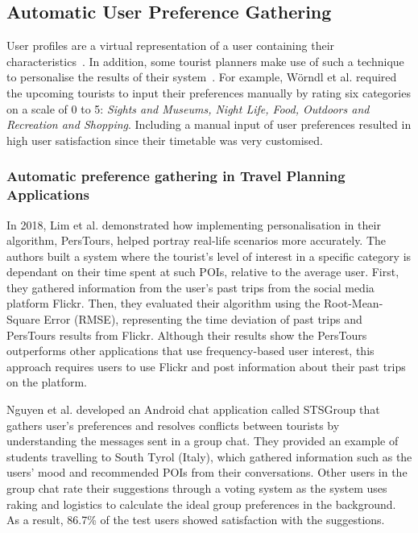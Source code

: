 
\subsection{Automatic User Preference Gathering}

User profiles are a virtual representation of a user
containing their characteristics~\cite{Cufoglu}. In
addition, some tourist planners make use of such a
technique to personalise the results of their
system~\cite{Worndl2017, Lim2018a, Tumas2009,
Gavalas2015}. For example, Wörndl et al.
\cite{Worndl2017} required the upcoming tourists to
input their preferences manually by rating six
categories on a scale of 0 to 5: \textit{Sights and Museums,
Night Life, Food, Outdoors and Recreation
 and Shopping}. Including a manual input of user
preferences resulted in high user satisfaction since
their timetable was very customised.

\subsubsection{Automatic preference gathering in Travel Planning Applications}

In 2018, Lim et al.\cite{Lim2018a} demonstrated how
implementing personalisation in their algorithm,
PersTours, helped portray real-life scenarios more
accurately. The authors built a system where the
tourist’s level of interest in a specific category is
dependant on their time spent at such POIs, relative
to the average user. First, they gathered information
from the user’s past trips from the social media
platform Flickr. Then, they evaluated their algorithm
using the Root-Mean-Square Error (RMSE), representing
the time deviation of past trips and PersTours results
from Flickr. Although their results show the PersTours
outperforms other applications that use
frequency-based user interest, this approach requires
users to use Flickr and post information about their
past trips on the platform.
 
Nguyen et al.\cite{Nguyen2018} developed an Android
chat application called STSGroup that gathers user’s
preferences and resolves conflicts between tourists by
understanding the messages sent in a group chat. They
provided an example of students travelling to South
Tyrol (Italy), which gathered information such as the
users’ mood and recommended POIs from their
conversations. Other users in the group chat rate
their suggestions through a voting system as the
system uses raking and logistics to calculate
the ideal group preferences in the background. As a
result, 86.7\% of the test users showed satisfaction
with the suggestions.  

